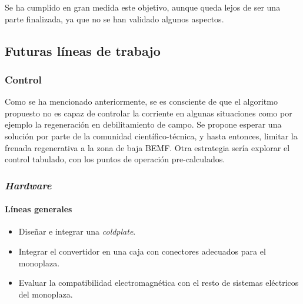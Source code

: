 Se ha cumplido en gran medida este objetivo, aunque queda lejos de ser una parte finalizada, ya que no se han validado algunos aspectos.

\subsection*{Futuras líneas de trabajo}

\subsubsection*{Control}

Como se ha mencionado anteriormente, se es consciente de que el algoritmo propuesto no es capaz de controlar la corriente en algunas situaciones como por ejemplo la regeneración en debilitamiento de campo. Se propone esperar una solución por parte de la comunidad científico-técnica, y hasta entonces, limitar la frenada regenerativa a la zona de baja BEMF. Otra estrategia sería explorar el control tabulado, con los puntos de operación pre-calculados.

\subsubsection*{\textit{Hardware}}

\paragraph*{Líneas generales}
\begin{itemize}
	\item Diseñar e integrar una \textit{coldplate}.
	\item Integrar el convertidor en una caja con conectores adecuados para el monoplaza.
	\item Evaluar la compatibilidad electromagnética con el resto de sistemas eléctricos del monoplaza.
\end{itemize}

